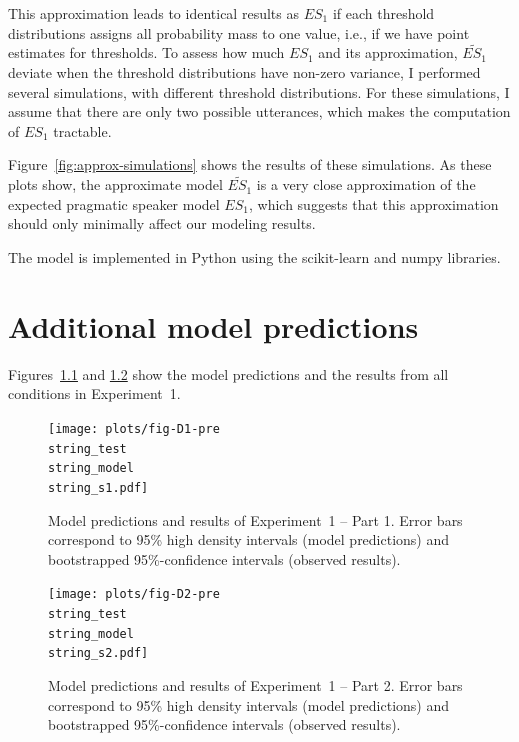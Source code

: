 This approximation leads to identical results as $ES_1$ if each threshold distributions assigns all probability mass to one value, 
i.e., if we have point estimates for thresholds. To assess how much $ES_1$ and its approximation, $\widetilde{ES_1}$ deviate when 
the threshold distributions have non-zero variance, I performed several simulations, with different threshold distributions. For these
simulations, I assume that there are only two possible utterances, which makes the computation of $ES_1$ tractable.

Figure~\ref{fig:approx-simulations} shows the results of these simulations. As these plots show, the approximate model $\widetilde{ES_1}$ is a very close approximation of the expected
pragmatic speaker model $ES_1$, which suggests that this approximation should only minimally affect our modeling results. 

The model is implemented in Python using the scikit-learn \parencite{Scikit2011} and numpy \parencite{vanderWalt2011} libraries.

\chapter{Additional model predictions}


Figures~\ref{fig:norming-results-model-1} and \ref{fig:norming-results-model-2} show the model predictions and the results from all conditions in Experiment~1. 

\begin{figure}[h!]
\texttt{[image: plots/fig-D1-pre\\string\_test\\string\_model\\string\_s1.pdf]}
\caption{Model predictions and results of Experiment~1 -- Part 1. Error bars correspond to 95\% high density intervals (model predictions) and bootstrapped 95\%-confidence intervals (observed results). \label{fig:norming-results-model-1}}

\end{figure}

\begin{figure}[h!]
\texttt{[image: plots/fig-D2-pre\\string\_test\\string\_model\\string\_s2.pdf]}
\caption{Model predictions and results of Experiment~1  -- Part 2. Error bars correspond to 95\% high density intervals (model predictions) and bootstrapped 95\%-confidence intervals (observed results). \label{fig:norming-results-model-2}}

\end{figure}



